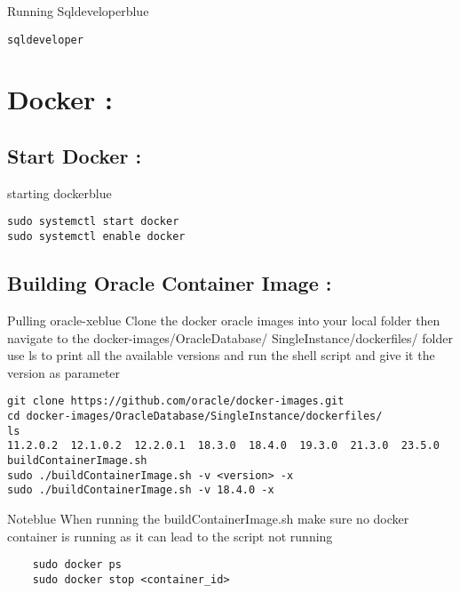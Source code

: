 \documentclass{article}
\begin{document}
\vspace{0.5cm}
\begin{prettyBox}{Running Sqldeveloper}{blue}
    \begin{verbatim}
sqldeveloper
    \end{verbatim}
\end{prettyBox}

\vspace{0.25cm}
\section{Docker : }
\subsection{Start Docker :}

\vspace{0.25cm}
\begin{prettyBox}{starting docker}{blue}
\begin{verbatim}
sudo systemctl start docker
sudo systemctl enable docker
\end{verbatim}
\end{prettyBox}

\vspace{0.25cm}
\subsection{Building Oracle Container Image :}

\vspace{0.25cm}
\begin{prettyBox}{Pulling oracle-xe}{blue}
Clone the docker oracle images into your local folder then navigate to the docker-images/OracleDatabase/
SingleInstance/dockerfiles/
folder use ls to print all the available versions and run the shell script and give it the version as parameter
\begin{verbatim}
git clone https://github.com/oracle/docker-images.git
cd docker-images/OracleDatabase/SingleInstance/dockerfiles/
ls
11.2.0.2  12.1.0.2  12.2.0.1  18.3.0  18.4.0  19.3.0  21.3.0  23.5.0  buildContainerImage.sh
sudo ./buildContainerImage.sh -v <version> -x
sudo ./buildContainerImage.sh -v 18.4.0 -x 
\end{verbatim}

\end{prettyBox}


\vspace{0.5cm}
\begin{prettyBox}{Note}{blue}
When running the buildContainerImage.sh make sure no docker container is running as it can lead to the script
not running 
\begin{verbatim}
    sudo docker ps 
    sudo docker stop <container_id>
\end{verbatim}
\end{prettyBox}
\end{document}
